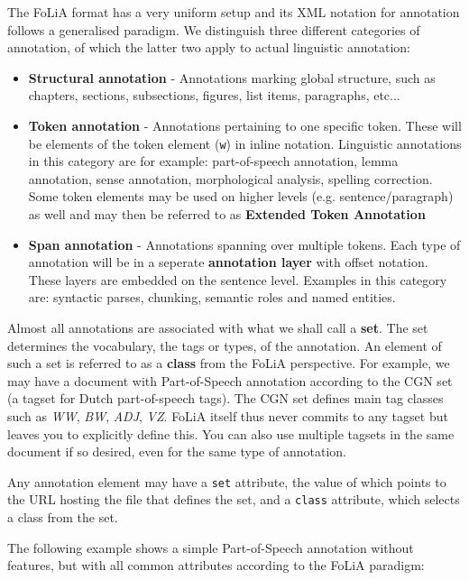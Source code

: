 \documentclass[a4paper,12pt]{report}
\begin{document}
The FoLiA format has a very uniform setup and its XML notation for annotation follows a generalised paradigm. We distinguish three different categories of annotation, of which the latter two apply to actual linguistic annotation:

\begin{itemize}
\item \textbf{Structural annotation} - Annotations marking global structure, such as chapters, sections, subsections, figures, list items, paragraphs, etc...
\item \textbf{Token annotation} - Annotations pertaining to one specific token. These will be elements of the token element (\texttt{w}) in inline notation. Linguistic annotations in this category are for example: part-of-speech annotation, lemma annotation, sense annotation, morphological analysis, spelling correction. Some token elements may be used on higher levels (e.g. sentence/paragraph) as well and may then be referred to as \textbf{Extended Token Annotation}
\item \textbf{Span annotation} - Annotations spanning over multiple tokens. Each type of annotation will be in a seperate \textbf{annotation layer} with offset notation. These layers are embedded on the sentence level. Examples in this category are: syntactic parses, chunking, semantic roles and named entities.
\end{itemize}

Almost all annotations are associated with what we shall call a \textbf{set}. The set determines the vocabulary, the tags or types, of the annotation. An element of such a set is referred to as a \textbf{class} from the FoLiA perspective. For example, we may have a document with Part-of-Speech annotation according to the CGN set (a tagset for Dutch part-of-speech tags). The CGN set defines main tag classes such as \emph{WW}, \emph{BW}, \emph{ADJ}, \emph{VZ}. FoLiA itself thus never commits to any tagset but leaves you to explicitly define this. You can also use multiple tagsets in the same document if so desired, even for the same type of annotation.

Any annotation element may have a \texttt{set} attribute, the value of which points to the URL hosting the file that defines the set, and a \texttt{class} attribute, which selects a class from the set.

The following example shows a simple Part-of-Speech annotation without features, but with all common attributes according to the FoLiA paradigm:
\end{document}
